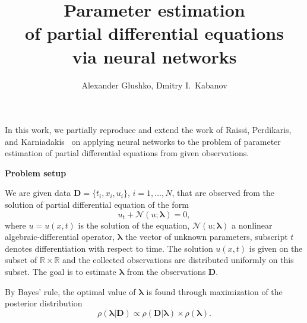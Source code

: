 \documentclass[a4paper, 12pt, parskip]{scrartcl}
\title{\vspace{-0.5cm}Parameter estimation\\of partial differential
        equations\\via neural networks}
\author{Alexander Glushko, Dmitry I.\ Kabanov}
\newcommand{\Data}{\vec{D}}
\renewcommand{\vec}[1]{\boldsymbol{#1}}
\newcommand{\VLambda}{\ensuremath{\vec{\lambda}}}
\newcommand{\R}{\mathbb R}
\newcommand{\NonlinOp}{\mathcal N\!}
\begin{document}
\maketitle

In this work, we partially reproduce and extend the work of Raissi, Perdikaris,
and Karniadakis~\cite{raissi2017pinnII} on applying neural networks to the
problem of parameter estimation of partial differential equations from given
observations.

\textbf{Problem setup}

We are given data $\Data = \{t_i, x_i, u_i\}$, $i=1, \dots, N$, that
are observed from the solution of partial differential equation of the form
\begin{equation}
    \label{eq:pde}
    u_t + \mathcal N\!(u; \VLambda) = 0,
\end{equation}
where  $u=u(x, t)$ is the solution of the equation,
$\NonlinOp(u; \VLambda)$ a nonlinear algebraic-differential operator,
$\VLambda$ the vector of unknown parameters, subscript $t$ denotes
differentiation with respect to time.
The solution $u(x,t)$ is given on the subset of $\R \times \R$ and the collected
observations are distributed uniformly on this subset.
The goal is to estimate $\VLambda$ from the observations $\Data$.

By Bayes' rule, the optimal value of $\VLambda$ is found through
maximization of the posterior distribution \cite{sivia2006data}
\begin{equation}
    \rho( \VLambda | \Data ) \propto
    \rho( \Data | \VLambda ) \times \rho( \VLambda ).
\end{equation}
\end{document}
